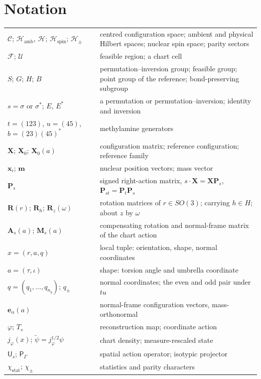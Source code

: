 \documentclass[12pt]{article}
\newcommand{\hilb}{\mathcal{H}}
\newcommand{\hamb}{\mathcal{H}_{\mathrm{amb}}}
\newcommand{\conf}{\mathcal{C}}
\newcommand{\spin}{\mathcal{H}_{\mathrm{spin}}}
\newcommand{\act}{\mathbin{\cdot}}
\newcommand{\stat}{\chi_{\mathrm{stat}}}
\newcommand{\X}{\mathbf{X}}                 %
\newcommand{\Pmat}[1]{\mathbf{P}_{#1}}      %
\newcommand{\Rmat}{\mathbf{R}}              %
\newcommand{\Uop}[1]{\mathsf{U}_{#1}}       %
\newcommand{\Pproj}[1]{\mathsf{P}_{#1}}     %
\newcommand{\jdens}{j_\varphi}              %
\begin{document}
\section*{Notation}
{\small
\begin{longtable}{@{}>{\raggedright\arraybackslash}p{5.9cm}>{\raggedright\arraybackslash}p{8.4cm}@{}}
\hline
$\conf$; $\hamb$, $\hilb$; $\spin$; $\hilb_\pm$ & centred configuration space; ambient and physical Hilbert spaces; nuclear spin space; parity sectors\\
$\mathcal F$; $\mathcal U$ & feasible region; a chart cell\\
$S$; $G$; $H$; $B$ & permutation--inversion group; feasible group; point group of the reference; bond-preserving subgroup\\
$s=\sigma$ or $\sigma^*$; $E$, $E^*$ & a permutation or permutation--inversion; identity and inversion\\
$t=(123)$, $u=(45)$, $b=(23)(45)^*$ & methylamine generators\\
$\X$; $\X_0$; $\X_0(a)$ & configuration matrix; reference configuration; reference family\\
$\mathbf x_i$; $\mathbf m$ & nuclear position vectors; mass vector\\
$\Pmat{s}$ & signed right-action matrix, $s\act\X=\X\Pmat{s}$, $\Pmat{st}=\Pmat{t}\Pmat{s}$\\
$\Rmat(r)$; $\Rmat_h$; $\Rmat_z(\omega)$ & rotation matrices of $r\in SO(3)$; carrying $h\in H$; about $z$ by $\omega$\\
$\mathbf A_s(a)$; $\mathbf M_s(a)$ & compensating rotation and normal-frame matrix of the chart action\\
$x=(r,a,q)$ & local tuple: orientation, shape, normal coordinates\\
$a=(\tau,\iota)$ & shape: torsion angle and umbrella coordinate\\
$q=(q_1,\ldots,q_{n_q})$; $q_\pm$ & normal coordinates; the even and odd pair under $tu$\\
$\mathbf e_\alpha(a)$ & normal-frame configuration vectors, mass-orthonormal\\
$\varphi$; $T_s$ & reconstruction map; coordinate action\\
$\jdens(x)$; $\widetilde\psi=\jdens^{1/2}\psi$ & chart density; measure-rescaled state\\
$\Uop{s}$; $\Pproj{\Gamma}$ & spatial action operator; isotypic projector\\
$\stat$; $\chi_\pm$ & statistics and parity characters\\

\end{longtable}}
\end{document}
